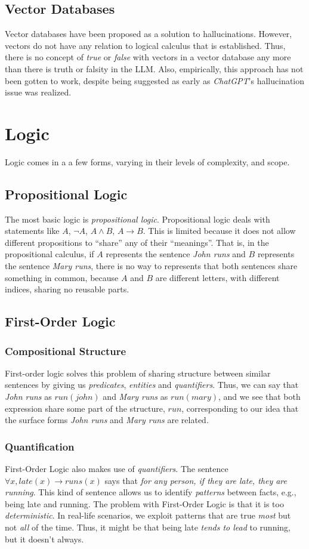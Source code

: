 \documentclass[12pt]{article}
\begin{document}
\subsection{Vector Databases}
Vector databases have been proposed as a solution to hallucinations.
However, vectors do not have any relation to logical calculus that is established.
Thus, there is no concept of {\em true} or {\em false} with vectors in a vector database any more than there is truth or falsity in the LLM.
Also, empirically, this approach has not been gotten to work, despite being suggested as early as {\em ChatGPT}'s hallucination issue was realized.
\section{Logic}
Logic comes in a a few forms, varying in their levels of complexity, and scope.

\subsection{Propositional Logic}
The most basic logic is {\em propositional logic}.
Propositional logic deals with statements like $A$, $\neg A$, $A \wedge B$, $A \rightarrow B$.
This is limited because it does not allow different propositions to ``share'' any of their ``meanings''.
That is, in the propositional calculus, if $A$ represents the sentence {\em John runs} and $B$ represents
the sentence {\em Mary runs}, there is no way to represents that both sentences share something
in common, because $A$ and $B$ are different letters, with different indices, sharing no reusable parts.

\subsection{First-Order Logic}
\subsubsection{Compositional Structure}
First-order logic solves this problem of sharing structure between similar sentences by
giving us {\em predicates}, {\em entities} and {\em quantifiers}.
Thus, we can say that {\em John runs} as $run(john)$ and {\em Mary runs} as $run(mary)$,
and we see that both expression share some part of the structure, $run$, corresponding
to our idea that the surface forms {\em John runs} and {\em Mary runs} are related.
\subsubsection{Quantification}
First-Order Logic also makes use of {\em quantifiers}.
The sentence $\forall x, late(x)\rightarrow runs(x)$ says that {\em for any person, if they are late, they are running}.
This kind of sentence allows us to identify {\em patterns} between facts, e.g., being late and running.
The problem with First-Order Logic is that it is too {\em deterministic}.
In real-life scenarios, we exploit patterns that are true {\em most} but not {\em all} of the time.
Thus, it might be that being late {\em tends to lead} to running, but it doesn't always.
\end{document}
